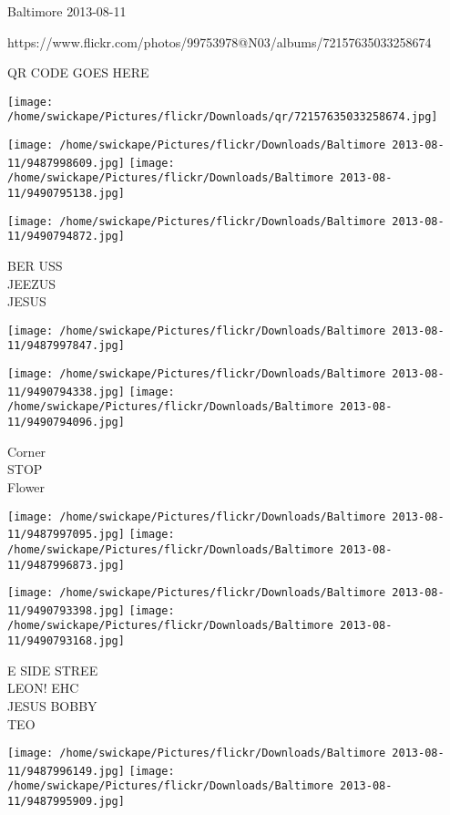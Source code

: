 \documentclass[10pt,letterpaper]{article}
\begin{document}
Baltimore 2013-08-11

https://www.flickr.com/photos/99753978@N03/albums/72157635033258674

QR CODE GOES HERE

\texttt{[image: /home/swickape/Pictures/flickr/Downloads/qr/72157635033258674.jpg]}
\pagebreak

\texttt{[image: /home/swickape/Pictures/flickr/Downloads/Baltimore 2013-08-11/9487998609.jpg]}
\texttt{[image: /home/swickape/Pictures/flickr/Downloads/Baltimore 2013-08-11/9490795138.jpg]}

\texttt{[image: /home/swickape/Pictures/flickr/Downloads/Baltimore 2013-08-11/9490794872.jpg]}

BER USS\\
JEEZUS\\
JESUS\\
\pagebreak

\texttt{[image: /home/swickape/Pictures/flickr/Downloads/Baltimore 2013-08-11/9487997847.jpg]}

\vspace{0.25in}
\texttt{[image: /home/swickape/Pictures/flickr/Downloads/Baltimore 2013-08-11/9490794338.jpg]}
\texttt{[image: /home/swickape/Pictures/flickr/Downloads/Baltimore 2013-08-11/9490794096.jpg]}

Corner\\
STOP\\
Flower\\
\pagebreak

\texttt{[image: /home/swickape/Pictures/flickr/Downloads/Baltimore 2013-08-11/9487997095.jpg]}
\texttt{[image: /home/swickape/Pictures/flickr/Downloads/Baltimore 2013-08-11/9487996873.jpg]}

\texttt{[image: /home/swickape/Pictures/flickr/Downloads/Baltimore 2013-08-11/9490793398.jpg]}
\texttt{[image: /home/swickape/Pictures/flickr/Downloads/Baltimore 2013-08-11/9490793168.jpg]}

E SIDE STREE\\
LEON! EHC\\
JESUS BOBBY\\
TEO\\
\pagebreak

\texttt{[image: /home/swickape/Pictures/flickr/Downloads/Baltimore 2013-08-11/9487996149.jpg]}
\texttt{[image: /home/swickape/Pictures/flickr/Downloads/Baltimore 2013-08-11/9487995909.jpg]}
\end{document}
